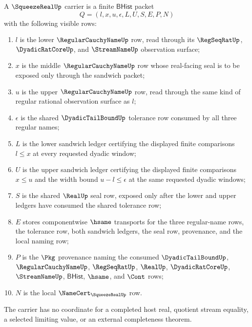 \begin{definition}
\label{def:squeeze-real-carrier}
A $\SqueezeRealUp$ carrier is a finite $\mathsf{BHist}$ packet
$$
Q=(l,x,u,\epsilon,L,U,S,E,P,N)
$$
with the following visible rows:
\begin{enumerate}
\item $l$ is the lower $\RegularCauchyNameUp$ row, read through its $\RegSeqRatUp$, $\DyadicRatCoreUp$, and $\StreamNameUp$ observation surface;
\item $x$ is the middle $\RegularCauchyNameUp$ row whose real-facing seal is to be exposed only through the sandwich packet;
\item $u$ is the upper $\RegularCauchyNameUp$ row, read through the same kind of regular rational observation surface as $l$;
\item $\epsilon$ is the shared $\DyadicTailBoundUp$ tolerance row consumed by all three regular names;
\item $L$ is the lower sandwich ledger certifying the displayed finite comparisons $l \le x$ at every requested dyadic window;
\item $U$ is the upper sandwich ledger certifying the displayed finite comparisons $x \le u$ and the width bound $u-l \le \epsilon$ at the same requested dyadic windows;
\item $S$ is the shared $\RealUp$ seal row, exposed only after the lower and upper ledgers have consumed the shared tolerance row;
\item $E$ stores componentwise $\hsame$ transports for the three regular-name rows, the tolerance row, both sandwich ledgers, the seal row, provenance, and the local naming row;
\item $P$ is the $\Pkg$ provenance naming the consumed $\DyadicTailBoundUp$, $\RegularCauchyNameUp$, $\RegSeqRatUp$, $\RealUp$, $\DyadicRatCoreUp$, $\StreamNameUp$, $\mathsf{BHist}$, $\hsame$, and $\Cont$ rows;
\item $N$ is the local $\NameCert_{\SqueezeRealUp}$ row.
\end{enumerate}
The carrier has no coordinate for a completed host real, quotient stream equality, a selected limiting value, or an external completeness theorem.
\end{definition}


